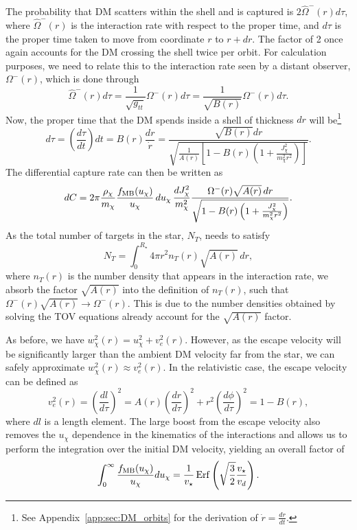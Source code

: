 The probability that DM scatters within the shell and is captured is $2\hat{\Omega}^-(r) d\tau$,
where $\hat{\Omega}^-(r)$ is the interaction rate with respect to the proper time, and $d\tau$ is the proper time taken to move from coordinate $r$ to $r + dr$. The factor of 2 once again accounts for the DM crossing the shell twice per orbit. For calculation purposes, we need to relate this to the interaction rate seen by a distant observer, $\Omega^-(r)$, which is done through
\begin{equation}
    \hat{\Omega}^-(r) d\tau = \frac{1}{\sqrt{g_{tt}}}\Omega^-(r)d\tau= \frac{1}{\sqrt{B(r)}}\Omega^-(r)d\tau.
\end{equation}
Now, the proper time that the DM spends inside a shell of thickness $dr$ will be\footnote{See Appendix~\ref{app:sec:DM_orbits} for the derivation of $\dot r = \frac{dr}{dt}$.}
\begin{equation}
    d\tau = \left( \frac{d\tau}{dt}\right) dt = B(r) \frac{dr}{\dot r} = \frac{\sqrt{B(r)} dr}{\sqrt{\frac{1}{A(r)} \left[ 1 - B(r)\left( 1 + \frac{J_\chi^2}{m_\chi^2 r^2} \right) \right]}}.
\end{equation}
% 
The differential capture rate can then be written as 
\begin{equation}
    dC =  2\pi  \frac{\rho_\chi}{m_\chi}\frac{f_{\rm MB}(u_\chi)}{u_\chi}\,du_\chi\,\frac{dJ^2_\chi}{m_\chi^2} \frac{\Omega^-(r)\sqrt{A(r)} \,dr}{\sqrt{1 - B(r)\left( 1 + \frac{J_\chi^2}{m_\chi^2 r^2} \right)}}.
\end{equation}
As the total number of targets in the star, $N_T$, needs to satisfy
\begin{equation}
    N_T = \int_0^{R_\star} 4\pi r^2 n_T(r)\sqrt{A(r)}\,dr,
\end{equation}
where $n_T(r)$ is the number density that appears in the interaction rate, we absorb the factor $\sqrt{A(r)}$ into the definition of $n_T(r)$, such that $\Omega^-(r)\sqrt{A(r)}\rightarrow \Omega^-(r)$. This is due to the number densities obtained by solving the TOV equations already account for the $\sqrt{A(r)}$ factor. 

As before, we have $w_\chi^2(r) = u_\chi^2 + v_e^2(r)$. However, as the escape velocity will be significantly larger than the ambient DM velocity far from the star, we can safely approximate $w_\chi^2(r)\approx v_e^2(r)$. 
In the relativistic case, the escape velocity can be defined as
\begin{equation}
    v_e^2(r) = \left(\frac{dl}{d\tau}\right)^2 = A(r) \left(\frac{dr}{d\tau}\right)^2 + r^2 \left(\frac{d\phi}{d\tau}\right)^2 = 1 - B(r),
    \label{ch3:eq:vesceq}
\end{equation}
where $dl$ is a length element. 
The large boost from the escape velocity also removes the $u_\chi$ dependence in the kinematics of the interactions and allows us to perform the integration over the initial DM velocity, yielding an overall factor of
\begin{equation}
    \int_0^\infty \frac{f_{\rm MB}(u_\chi)}{u_\chi} du_\chi = \frac{1}{v_\star}{\rm \,Erf}\left(\sqrt{\frac{3}{2}}\frac{v_\star}{v_d}\right).
\end{equation}


